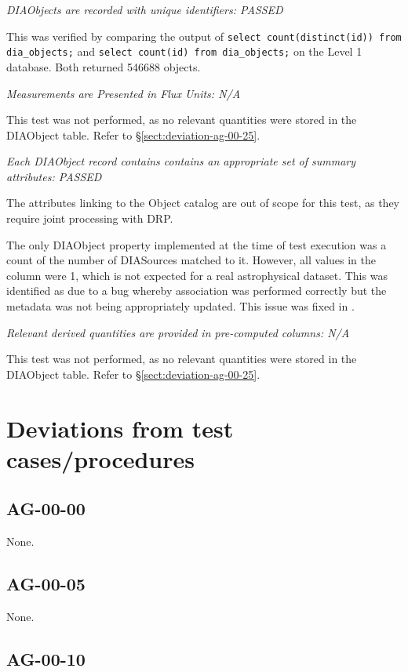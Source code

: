 \documentclass[DM,lsstdraft,STR,toc]{lsstdoc}
\begin{document}
\textit{DIAObjects are recorded with unique identifiers: PASSED}

This was verified by comparing the output of \texttt{select count(distinct(id))
from dia\_objects;} and \texttt{select count(id) from dia\_objects;} on the
Level 1 database. Both returned 546688 objects.

\textit{Measurements are Presented in Flux Units: N/A}

This test was not performed, as no relevant quantities were stored in the DIAObject table. Refer to \S\ref{sect:deviation-ag-00-25}.

\textit{Each DIAObject record contains contains an appropriate set of summary attributes: PASSED}

The attributes linking to the Object catalog are out of scope for this test, as
they require joint processing with DRP.

The only DIAObject property implemented at the time of test execution was a count of the number of DIASources matched to it.
However, all values in the column were 1, which is not expected for a real astrophysical dataset.
This was identified as due to a bug whereby association was performed correctly but the metadata was not being appropriately updated.
This issue was fixed in .

\textit{Relevant derived quantities are provided in pre-computed columns: N/A}

This test was not performed, as no relevant quantities were stored in the DIAObject table. Refer to \S\ref{sect:deviation-ag-00-25}.

\section{Deviations from test cases/procedures}

\subsection{AG-00-00}

None.

\subsection{AG-00-05}
\label{sect:deviation-ag-00-05}

None.

\subsection{AG-00-10}
\label{sect:deviation-ag-00-10}
\end{document}
